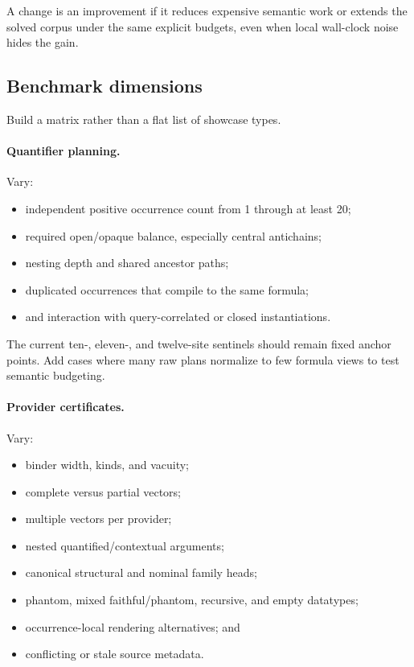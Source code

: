 \documentclass[11pt]{article}
\begin{document}
A change is an improvement if it reduces expensive semantic work or extends the
solved corpus under the same explicit budgets, even when local wall-clock noise
hides the gain.

\subsection{Benchmark dimensions}

Build a matrix rather than a flat list of showcase types.

\paragraph{Quantifier planning.}

Vary:

\begin{itemize}
  \item independent positive occurrence count from 1 through at least 20;
  \item required open/opaque balance, especially central antichains;
  \item nesting depth and shared ancestor paths;
  \item duplicated occurrences that compile to the same formula;
  \item and interaction with query-correlated or closed instantiations.
\end{itemize}

The current ten-, eleven-, and twelve-site sentinels should remain fixed anchor
points.  Add cases where many raw plans normalize to few formula views to test
semantic budgeting.

\paragraph{Provider certificates.}

Vary:

\begin{itemize}
  \item binder width, kinds, and vacuity;
  \item complete versus partial vectors;
  \item multiple vectors per provider;
  \item nested quantified/contextual arguments;
  \item canonical structural and nominal family heads;
  \item phantom, mixed faithful/phantom, recursive, and empty datatypes;
  \item occurrence-local rendering alternatives; and
  \item conflicting or stale source metadata.
\end{itemize}
\end{document}
